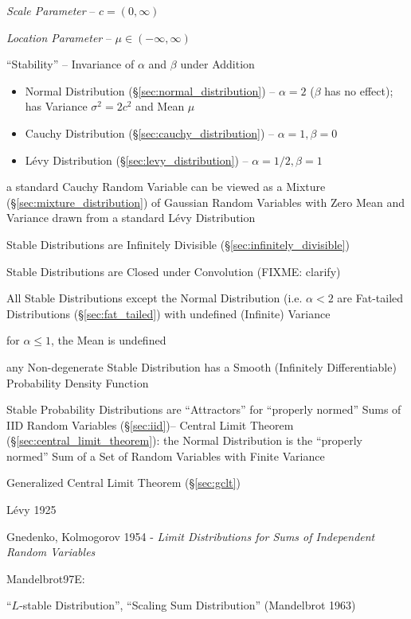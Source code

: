 \emph{Scale Parameter} -- $c = (0, \infty)$

\emph{Location Parameter} -- $\mu \in (-\infty, \infty)$

``Stability'' -- Invariance of $\alpha$ and $\beta$ under Addition

\begin{itemize}
  \item Normal Distribution (\S\ref{sec:normal_distribution}) -- $\alpha = 2$
    ($\beta$ has no effect); has Variance $\sigma^2 = 2c^2$ and Mean $\mu$
  \item Cauchy Distribution (\S\ref{sec:cauchy_distribution}) --
    $\alpha = 1, \beta = 0$
  \item L\'evy Distribution (\S\ref{sec:levy_distribution}) --
    $\alpha = 1/2, \beta = 1$
\end{itemize}

a standard Cauchy Random Variable can be viewed as a Mixture
(\S\ref{sec:mixture_distribution}) of Gaussian Random Variables with Zero Mean
and Variance drawn from a standard L\'evy Distribution

Stable Distributions are Infinitely Divisible (\S\ref{sec:infinitely_divisible})

Stable Distributions are Closed under Convolution (FIXME: clarify)

All Stable Distributions except the Normal Distribution (i.e. $\alpha < 2$ are
Fat-tailed Distributions (\S\ref{sec:fat_tailed}) with undefined (Infinite)
Variance

for $\alpha \leq 1$, the Mean is undefined

any Non-degenerate Stable Distribution has a Smooth (Infinitely Differentiable)
Probability Density Function

Stable Probability Distributions are ``Attractors'' for ``properly normed'' Sums
of IID Random Variables (\S\ref{sec:iid})-- Central Limit Theorem
(\S\ref{sec:central_limit_theorem}): the Normal Distribution is the ``properly
normed'' Sum of a Set of Random Variables with Finite Variance

Generalized Central Limit Theorem (\S\ref{sec:gclt})

L\'evy 1925

Gnedenko, Kolmogorov 1954 - \emph{Limit Distributions for Sums of Independent
Random Variables}

Mandelbrot97E:

``$L$-stable Distribution'', ``Scaling Sum Distribution'' (Mandelbrot 1963)

